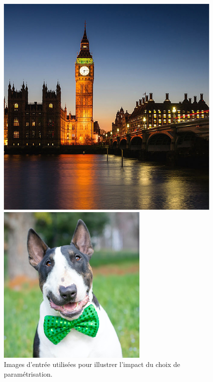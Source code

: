 \documentclass{article}
\begin{document}
\begin{figure}[!h]

      \begin{minipage}[b]{0.4\linewidth}
       \centering
       \includegraphics[width = \linewidth]{img_b.png}     
      \end{minipage}
    \hfill
      \begin{minipage}[b]{0.375\linewidth}
       \centering
       \includegraphics[width = \linewidth]{dog.png}     
      \end{minipage}
      \caption{Images d'entrée utilisées pour illustrer l'impact du choix de paramétrisation.}
      \label{fig:input_FFT_decorrelated}
    
    \end{figure}
\end{document}

